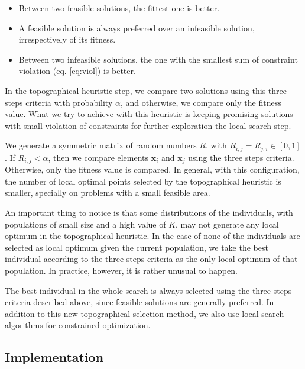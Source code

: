 \begin{itemize}

\item Between two feasible solutions, the fittest one is better.

\item A feasible solution is always preferred over an infeasible solution, irrespectively of its fitness.

\item Between two infeasible solutions, the one with the smallest sum of constraint violation (eq. \ref{eq:viol}) is better.

\end{itemize}


In the topographical heuristic step, we compare two solutions using this three steps criteria with probability $\alpha$, and otherwise, we compare only the fitness value. What we try to achieve with this heuristic is keeping promising solutions with small violation of constraints for further exploration the local search step.

We generate a symmetric matrix of random numbers $R$, with $R_{i, j} = R_{j, i} \in [0, 1]$. If $R_{i, j} < \alpha$, then we compare elements $\bm{x}_i$ and $\bm{x}_j$ using the three steps criteria. Otherwise, only the fitness value is compared. In general, with this configuration, the number of local optimal points selected by the topographical heuristic is smaller, specially on problems with a small feasible area. 

An important thing to notice is that some distributions of the individuals, with populations of small size and a high value of $K$, may not generate any local optimum in the topographical heuristic. In the case of none of the individuals are selected as local optimum given the current population, we take the best individual according to the three steps criteria as the only local optimum of that population. In practice, however, it is rather unusual to happen.

The best individual in the whole search is always selected using the three steps criteria described above, since feasible solutions are generally preferred. In addition to this new topographical selection method, we also use local search algorithms for constrained optimization.


\subsection{Implementation}

